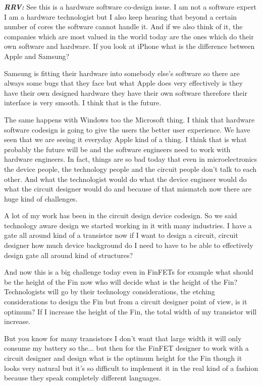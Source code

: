 \begin{multicols}{2}
\textbf{\textit{RRV:}} See this is a hardware software co-design issue. I am not a software expert I am a hardware technologist but I also keep hearing that beyond a certain number of cores the software cannot handle it. And if we also think of it, the companies which are most valued in the world today are the ones which do their own software and hardware. If you look at iPhone what is the difference between Apple and Samsung?

Samsung is fitting their hardware into somebody else’s software so there are always some bugs that they face but what Apple does very effectively is they have their own designed hardware they have their own software therefore their interface is very smooth. I think that is the future. 

The same happens with Windows too the Microsoft thing. I think that hardware software codesign is going to give the users the better user experience. We have seen that we are seeing it everyday Apple kind of a thing. I think that is what probably the future will be and the software engineers need to work with hardware engineers. In fact, things are so bad today that even in microelectronics the device people, the technology people and the circuit people don’t talk to each other. And what the technologist would do what the device engineer would do what the circuit designer would do and because of that mismatch now there are huge kind of challenges.

A lot of my work has been in the circuit design device codesign. So we said technology aware design we started working in it with many industries. I have a gate all around kind of a transistor now if I want to design a circuit, circuit designer how much device background do I need to have to be able to effectively design gate all around kind of structures? 

And now this is a big challenge today even in FinFETs for example what should be the height of the Fin now who will decide what is the height of the Fin? Technologists will go by their technology considerations, the etching considerations to design the Fin but from a circuit designer point of view, is it optimum? If I increase the height of the Fin, the total width of my transistor will increase.

But you know for many transistors I don’t want that large width it will only consume my battery so the... but then for the FinFET designer to work with a circuit designer and design what is the optimum height for the Fin though it looks very natural but it’s so difficult to implement it in the real kind of a fashion because they speak completely different languages.


\end{multicols}
